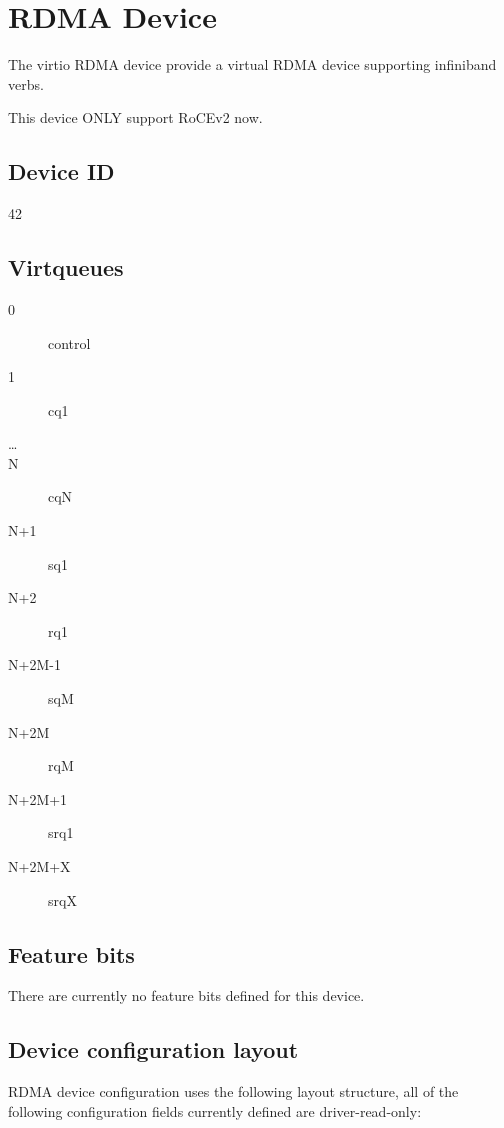 \section{RDMA Device}\label{sec:Device Types / RDMA Device}

The virtio RDMA device provide a virtual RDMA device supporting infiniband verbs.

This device ONLY support RoCEv2 now.

\subsection{Device ID}\label{sec:Device Types / RDMA Device / Device ID}
  42

\subsection{Virtqueues}\label{sec:Device Types / RDMA Device / Virtqueues}
\begin{description}
\item[0] control
\item[1] cq1
\item[\ldots] 
\item[N] cqN
\item[N+1] sq1
\item[N+2] rq1
\item[N+2M-1] sqM
\item[N+2M] rqM
\item[N+2M+1] srq1
\item[N+2M+X] srqX 
\end{description}

\subsection{Feature bits}\label{sec:Device Types / RDMA Device / Feature bits}

There are currently no feature bits defined for this device.

\subsection{Device configuration layout}\label{sec:Device Types / RDMA Device / Device configuration layout}

RDMA device configuration uses the following layout structure,
all of the following configuration fields currently defined are driver-read-only:

